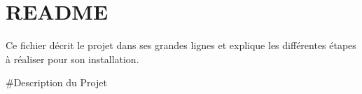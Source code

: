 \chapter{README}
\hypertarget{md_README}{}\label{md_README}
Ce fichier décrit le projet dans ses grandes lignes et explique les différentes étapes à réaliser pour son installation.

\#\+Description du Projet 